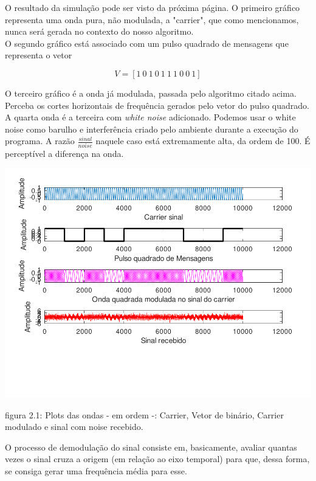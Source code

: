 \documentclass[11pt,a4paper]{report}
\begin{document}
	O resultado da simulação pode ser visto da próxima página. O primeiro gráfico representa uma onda pura, não modulada, a "carrier", que como mencionamos, nunca será gerada no contexto do nosso algoritmo.\\
	
	O segundo gráfico está associado com um pulso quadrado de mensagens que representa o vetor 
	
	\[V = [1\ 0\ 1\ 0\ 1\ 1\ 1\ 0\ 0\ 1]\]
	
	O terceiro gráfico é a onda já modulada, passada pelo algoritmo citado acima. Perceba os cortes horizontais de frequência gerados pelo vetor do pulso quadrado.\\
	
	A quarta onda é a terceira com {\it white noise} adicionado. Podemos usar o white noise como barulho e interferência criado pelo ambiente durante a execução do programa. A razão $\frac{sinal}{noise}$ naquele caso está extremamente alta, da ordem de 100. É perceptível a diferença na onda.
	\begin{center}
	
	\includegraphics[clip, trim=0.0cm 0cm 0.0cm 0.0cm, width=1.00\textwidth]{sinais}
	
	\end{center}

\begin{center}
	{\footnotesize figura 2.1: Plots das ondas - em ordem -: Carrier, Vetor de binário, Carrier modulado e sinal com noise recebido.}
\end{center}

		O processo de demodulação do sinal consiste em, basicamente, avaliar quantas vezes o sinal cruza a origem (em relação ao eixo temporal) para que, dessa forma, se consiga gerar uma frequência média para esse.\\
		
\end{document}
